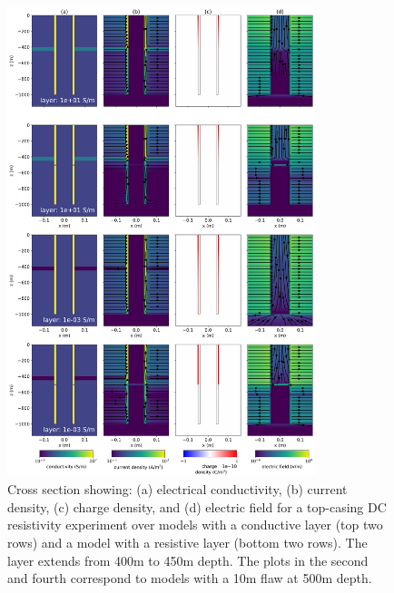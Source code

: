 \begin{figure}
    \begin{center}
    \includegraphics[width=0.8\textwidth]{figures/dc_casing/integrity_layer_physics.png}
    \end{center}
\caption{
    Cross section showing: (a) electrical conductivity, (b) current density, (c) charge density,
    and (d) electric field for a top-casing DC resistivity experiment over models with a conductive layer
    (top two rows) and a model with a resistive layer (bottom two rows). The layer extends from
    400m to 450m depth. The plots in the second and fourth correspond to models with a 10m flaw at 500m depth.
}
\label{fig:integrity_layer_physics}
\end{figure}

